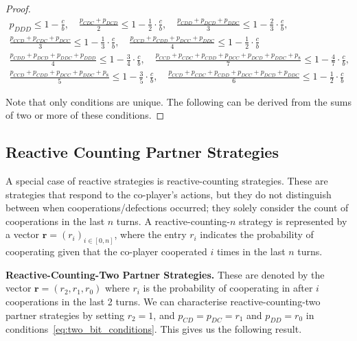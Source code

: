 \documentclass{article}
\theoremstyle{definition}
\begin{document}
\begin{proof}
\begin{equation*}
\begin{array}{c}
  p_{DDD} \leq 1 \!- \!\frac{c}{b},
  \quad \frac{p_{CDC} + p_{DCD}}{2} \leq 1 - \frac{1}{2} \cdot \frac{c}{b}, 
  \quad \frac{p_{CDD} + p_{DCD} + p_{DDC}}{3} \leq 1 - \frac{2}{3} \cdot \frac{c}{b}, \\ [.5cm]
  \frac{p_{CCD} + p_{CDC} + p_{DCC}}{3} \leq 1 - \frac{1}{3} \cdot \frac{c}{b},
  \quad \frac{p_{CCD} + p_{CDD} + p_{DCC} + p_{DDC}}{4} \leq 1 - \frac{1}{2}  \cdot \frac{c}{b} \\ [.5cm]
  \frac{p_{CDD} + p_{DCD} + p_{DDC} + p_{DDD}}{4} \leq 1 - \frac{3}{4} \cdot \frac{c}{b},
  \quad \frac{p_{CCD} + p_{CDC} + p_{CDD} + p_{DCC} + p_{DCD} + p_{DDC} + p_{8}}{7} \leq 1 - \frac{4}{7} \cdot \frac{c}{b}, \\ [.5cm]
  \frac{p_{CCD} + p_{CDD} + p_{DCC} + p_{DDC} + p_{8}}{5} \leq 1 - \frac{3}{5} \cdot \frac{c}{b},
  \quad \frac{p_{CCD} + p_{CDC} + p_{CDD} + p_{DCC} + p_{DCD} + p_{DDC}}{6} \leq 1 - \frac{1}{2} \cdot \frac{c}{b}
\end{array}
\end{equation*}

Note that only conditions are unique. The following can be derived from the
sums of two or more of these conditions.

\end{proof}


\subsection{Reactive Counting Partner Strategies}

A special case of reactive strategies is reactive-counting strategies. These are
strategies that respond to the co-player's actions, but they do not distinguish
between when cooperations/defections occurred; they solely consider the count of
cooperations in the last $n$ turns. A reactive-counting-$n$ strategy is represented
by a vector $\mathbf{r}=(r_i)_{i \in [0, n]}$, where the entry \(r_i\)
indicates the probability of cooperating given that the co-player cooperated
\(i\) times in the last \(n\) turns.

{\bf Reactive-Counting-Two Partner Strategies.} These are denoted by the vector
$\mathbf{r}=(r_2, r_1, r_0)$ where $r_i$ is the probability of cooperating in
after $i$ cooperations in the last 2 turns. We can characterise reactive-counting-two
partner strategies by setting $r_2 = 1$, and $p_{CD} = p_{DC} = r_1$ and $p_{DD} = r_0$
in conditions~\eqref{eq:two_bit_conditions}. This gives us the following result.
\end{document}
